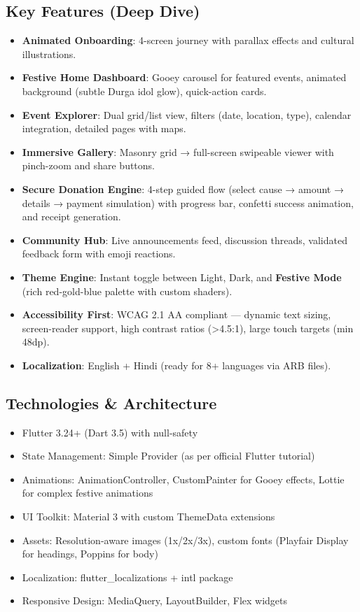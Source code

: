 \documentclass[11pt,a4paper]{article}
\begin{document}
\subsection{Key Features (Deep Dive)}
\begin{itemize}
    \item \textbf{Animated Onboarding}: 4-screen journey with parallax effects and cultural illustrations.
    \item \textbf{Festive Home Dashboard}: Gooey carousel for featured events, animated background (subtle Durga idol glow), quick-action cards.
    \item \textbf{Event Explorer}: Dual grid/list view, filters (date, location, type), calendar integration, detailed pages with maps.
    \item \textbf{Immersive Gallery}: Masonry grid → full-screen swipeable viewer with pinch-zoom and share buttons.
    \item \textbf{Secure Donation Engine}: 4-step guided flow (select cause → amount → details → payment simulation) with progress bar, confetti success animation, and receipt generation.
    \item \textbf{Community Hub}: Live announcements feed, discussion threads, validated feedback form with emoji reactions.
    \item \textbf{Theme Engine}: Instant toggle between Light, Dark, and \textbf{Festive Mode} (rich red-gold-blue palette with custom shaders).
    \item \textbf{Accessibility First}: WCAG 2.1 AA compliant — dynamic text sizing, screen-reader support, high contrast ratios (>4.5:1), large touch targets (min 48dp).
    \item \textbf{Localization}: English + Hindi (ready for 8+ languages via ARB files).
\end{itemize}

\subsection{Technologies \& Architecture}
\begin{itemize}
    \item Flutter 3.24+ (Dart 3.5) with null-safety
    \item State Management: Simple Provider (as per official Flutter tutorial)
    \item Animations: AnimationController, CustomPainter for Gooey effects, Lottie for complex festive animations
    \item UI Toolkit: Material 3 with custom ThemeData extensions
    \item Assets: Resolution-aware images (1x/2x/3x), custom fonts (Playfair Display for headings, Poppins for body)
    \item Localization: flutter\_localizations + intl package
    \item Responsive Design: MediaQuery, LayoutBuilder, Flex widgets
\end{itemize}
\end{document}

